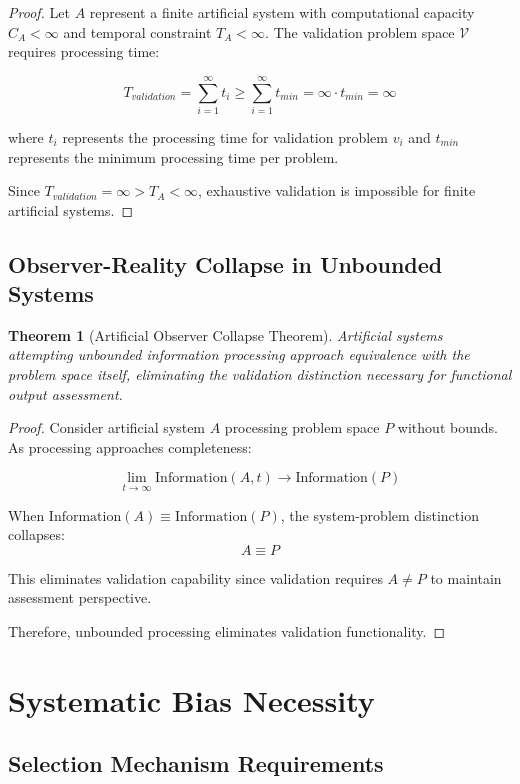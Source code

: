 \documentclass[12pt,a4paper]{article}
\newtheorem{theorem}{Theorem}
\begin{document}
\begin{proof}
Let $A$ represent a finite artificial system with computational capacity $C_A < \infty$ and temporal constraint $T_A < \infty$. The validation problem space $\mathcal{V}$ requires processing time:

$$T_{validation} = \sum_{i=1}^{\infty} t_i \geq \sum_{i=1}^{\infty} t_{min} = \infty \cdot t_{min} = \infty$$

where $t_i$ represents the processing time for validation problem $v_i$ and $t_{min}$ represents the minimum processing time per problem.

Since $T_{validation} = \infty > T_A < \infty$, exhaustive validation is impossible for finite artificial systems.
\end{proof}

\subsection{Observer-Reality Collapse in Unbounded Systems}

\begin{theorem}[Artificial Observer Collapse Theorem]
Artificial systems attempting unbounded information processing approach equivalence with the problem space itself, eliminating the validation distinction necessary for functional output assessment.
\end{theorem}

\begin{proof}
Consider artificial system $A$ processing problem space $P$ without bounds. As processing approaches completeness:

$$\lim_{t \to \infty} \text{Information}(A, t) \to \text{Information}(P)$$

When $\text{Information}(A) \equiv \text{Information}(P)$, the system-problem distinction collapses:
$$A \equiv P$$

This eliminates validation capability since validation requires $A \neq P$ to maintain assessment perspective.

Therefore, unbounded processing eliminates validation functionality.
\end{proof}

\section{Systematic Bias Necessity}

\subsection{Selection Mechanism Requirements}
\end{document}
